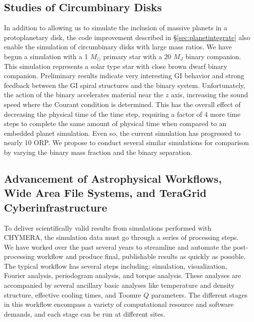 \documentclass[12pt,preprint2]{aastex}
\begin{document}
\subsection{Studies of Circumbinary Disks}\label{sec:binary}

In addition to allowing us to simulate the inclusion of massive planets in a protoplanetary disk, the code improvement
described in \S\ref{sec:planetintegrate} also enable the simulation of circumbinary disks with large mass ratios. We
have begun a simulation with a 1 $M_\odot$ primary star with a 20 $M_J$ binary companion. This simulation represents a
solar type star with close brown dwarf binary companion. Preliminary results indicate very interesting GI behavior and
strong feedback between the GI spiral structures and the binary system. Unfortunately, the action of the binary
accelerates material near the $z$ axis, increasing the sound speed where the Courant condition is determined. This has
the overall effect of decreasing the physical time of the time step, requiring a factor of 4 more time steps to complete
the same amount of physical time when compared to an embedded planet simulation. Even so, the current simulation has
progressed to nearly 10 ORP. We propose to conduct several similar simulations for comparison by varying the binary mass
fraction and the binary separation. 

\subsection{Advancement of Astrophysical Workflows, Wide Area File Systems, and TeraGrid
  Cyberinfrastructure}\label{sec:CI}

To deliver scientifically valid results from simulations performed with CHYMERA, the simulation data must go through a
series of processing steps. We have worked over the past several years to streamline and automate the post-processing
workflow and produce final, publishable results as quickly as possible. The typical workflow has several steps
including: simulation, visualization, Fourier analysis, periodogram analysis, and torque analysis. These analyses are
accompanied by several ancillary basic analyses like temperature and density structure, effective cooling times, and
Toomre $Q$ parameters. The different stages in this workflow encompass a variety of computational resource and software
demands, and each stage can be run at different sites. 
\end{document}
